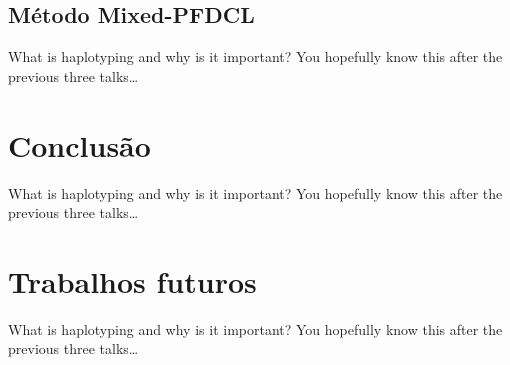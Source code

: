 \documentclass[brazil]{beamer}
\begin{document}
\subsection{Método Mixed-PFDCL}
\begin{frame}{What is haplotyping and why is it important?}
  You hopefully know this after the previous three talks\dots
\end{frame}

\section{Conclusão}

\begin{frame}{What is haplotyping and why is it important?}
  You hopefully know this after the previous three talks\dots
\end{frame}

\section{Trabalhos futuros}

\begin{frame}{What is haplotyping and why is it important?}
  You hopefully know this after the previous three talks\dots
\end{frame}

\end{document}
